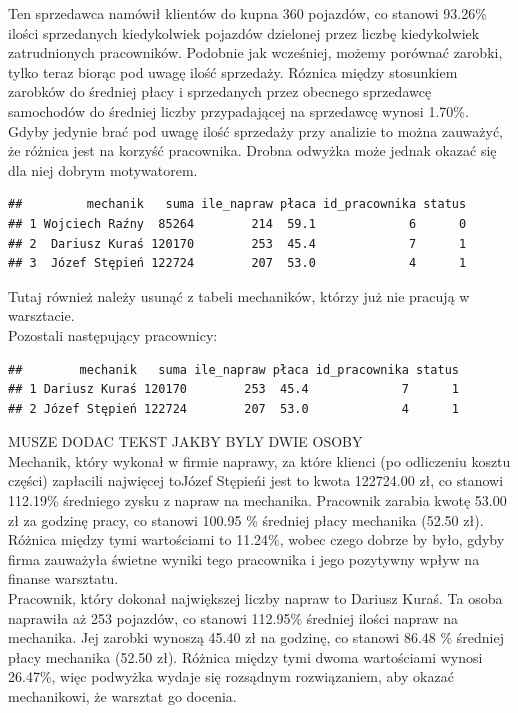 \documentclass{article}\usepackage[]{graphicx}\usepackage[]{xcolor}
\makeatletter
\newenvironment{kframe}{%
 \def\at@end@of@kframe{}%
 \ifinner\ifhmode%
  \def\at@end@of@kframe{\end{minipage}}%
  \begin{minipage}{\columnwidth}%
 \fi\fi%
 \def\FrameCommand##1{\hskip\@totalleftmargin \hskip-\fboxsep
 \colorbox{shadecolor}{##1}\hskip-\fboxsep
     \hskip-\linewidth \hskip-\@totalleftmargin \hskip\columnwidth}%
 \MakeFramed {\advance\hsize-\width
   \@totalleftmargin\z@ \linewidth\hsize
   \@setminipage}}%
 {\par\unskip\endMakeFramed%
 \at@end@of@kframe}
\newenvironment{knitrout}{}{} %
\makeatother
\begin{document}
Ten sprzedawca namówił klientów do kupna 360 pojazdów, co stanowi 93.26\% ilości sprzedanych kiedykolwiek pojazdów dzielonej przez liczbę kiedykolwiek zatrudnionych pracowników. Podobnie jak wcześniej, możemy porównać zarobki, tylko teraz biorąc pod uwagę ilość sprzedaży. Róznica między stosunkiem zarobków do średniej płacy i sprzedanych przez obecnego sprzedawcę samochodów do średniej liczby przypadającej na sprzedawcę  wynosi 1.70\%. Gdyby jedynie brać pod uwagę ilość sprzedaży przy analizie to można zauważyć, że różnica jest na korzyść pracownika. Drobna odwyżka może jednak okazać się dla niej dobrym motywatorem. 

\begin{knitrout}
\color{fgcolor}\begin{kframe}
\begin{verbatim}
##         mechanik   suma ile_napraw płaca id_pracownika status
## 1 Wojciech Raźny  85264        214  59.1             6      0
## 2  Dariusz Kuraś 120170        253  45.4             7      1
## 3  Józef Stępień 122724        207  53.0             4      1
\end{verbatim}
\end{kframe}
\end{knitrout}


Tutaj również należy usunąć z tabeli mechaników, którzy już nie pracują w warsztacie. \\

Pozostali następujący pracownicy:

\begin{knitrout}
\color{fgcolor}\begin{kframe}
\begin{verbatim}
##        mechanik   suma ile_napraw płaca id_pracownika status
## 1 Dariusz Kuraś 120170        253  45.4             7      1
## 2 Józef Stępień 122724        207  53.0             4      1
\end{verbatim}
\end{kframe}
\end{knitrout}

MUSZE DODAC TEKST JAKBY BYLY DWIE OSOBY \\

Mechanik, który wykonał w firmie naprawy, za które klienci (po odliczeniu kosztu części) zapłacili najwięcej toJózef Stępieńi jest to kwota 122724.00 zł, co stanowi 112.19\% średniego zysku z napraw na mechanika. Pracownik zarabia kwotę 53.00 zł za godzinę pracy, co stanowi 100.95 \% średniej płacy mechanika (52.50 zł). Różnica między tymi wartościami to 11.24\%, wobec czego dobrze by było, gdyby firma zauważyła świetne wyniki tego pracownika i jego pozytywny wpływ na finanse warsztatu. \\

Pracownik, który dokonał największej liczby napraw to Dariusz Kuraś. Ta osoba naprawiła aż 253 pojazdów, co stanowi 112.95\% średniej ilości napraw na mechanika. Jej zarobki wynoszą 45.40 zł na godzinę, co stanowi 86.48 \% średniej płacy mechanika (52.50 zł). Różnica między tymi dwoma wartościami wynosi 26.47\%, więc podwyżka wydaje się rozsądnym rozwiązaniem, aby okazać mechanikowi, że warsztat go docenia.
\end{document}
